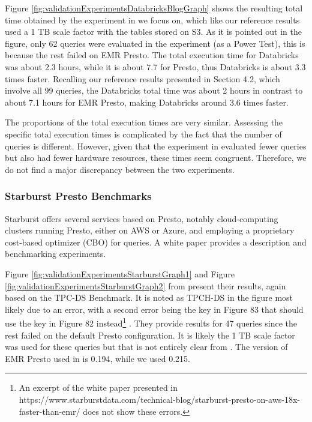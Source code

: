 Figure \ref{fig:validationExperimentsDatabricksBlogGraph} shows the resulting total time obtained by the experiment in \cite{databricksReport} we focus on, which like our reference results used a 1 TB scale factor with the tables stored on S3. As it is pointed out in the figure, only 62 queries were evaluated in the experiment (as a Power Test), this is because the rest failed on EMR Presto. The total execution time for Databricks was about 2.3 hours, while it is about 7.7 for Presto, thus Databricks is about 3.3 times faster. Recalling our reference results presented in Section 4.2, which involve all 99 queries, the Databricks total time was about 2 hours in contrast to about 7.1 hours for EMR Presto, making Databricks around 3.6 times faster.

The proportions of the total execution times are very similar. Assessing the specific total execution times is complicated by the fact that the number of queries is different. However, given that the experiment in \cite{databricksReport} evaluated fewer queries but also had fewer hardware resources, these times seem congruent. Therefore, we do not find a major discrepancy between the two experiments.

\subsubsection{Starburst Presto Benchmarks}

Starburst offers several services based on Presto, notably cloud-computing clusters running Presto, either on AWS or Azure, and employing a proprietary cost-based optimizer (CBO) for queries. A white paper \cite{starburstReport} provides a description and benchmarking experiments.

Figure \ref{fig:validationExperimentsStarburstGraph1} and Figure \ref{fig:validationExperimentsStarburstGraph2} from \cite{starburstReport} present their results, again based on the TPC-DS Benchmark. It is noted as TPCH-DS in the figure most likely due to an error, with a second error being the key in Figure 83 that should use the key in Figure 82 instead\footnote{An excerpt of the white paper presented in https://www.starburstdata.com/technical-blog/starburst-presto-on-aws-18x-faster-than-emr/ does not show these errors.} . They provide results for 47 queries since the rest failed on the default Presto configuration. It is likely the 1 TB scale factor was used for these queries but that is not entirely clear from \cite{starburstReport}. The version of EMR Presto used in \cite{starburstReport} is 0.194, while we used 0.215.

